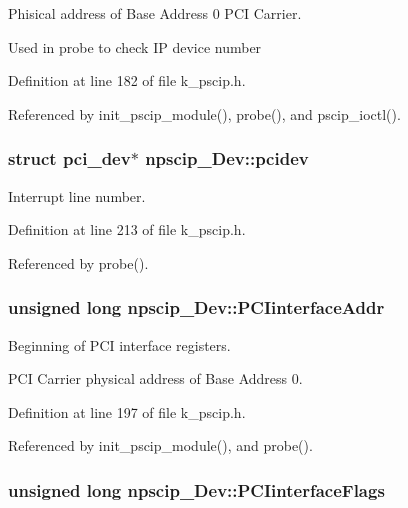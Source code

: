 Phisical address of Base Address 0 PCI Carrier. 

Used in probe to check IP device number 

Definition at line 182 of file k\_\-pscip.h.

Referenced by init\_\-pscip\_\-module(), probe(), and pscip\_\-ioctl().\hypertarget{structnpscip___dev_d017ea6be67a911fa7e0227048f42112}{
\subsubsection[{pcidev}]{\setlength{\rightskip}{0pt plus 5cm}struct pci\_\-dev$\ast$ {\bf npscip\_\-Dev::pcidev}}}
\label{structnpscip___dev_d017ea6be67a911fa7e0227048f42112}


Interrupt line number. 



Definition at line 213 of file k\_\-pscip.h.

Referenced by probe().\hypertarget{structnpscip___dev_e8a93765bbde1cad3218f1611d6ae623}{
\subsubsection[{PCIinterfaceAddr}]{\setlength{\rightskip}{0pt plus 5cm}unsigned long {\bf npscip\_\-Dev::PCIinterfaceAddr}}}
\label{structnpscip___dev_e8a93765bbde1cad3218f1611d6ae623}


Beginning of PCI interface registers. 

PCI Carrier physical address of Base Address 0. 

Definition at line 197 of file k\_\-pscip.h.

Referenced by init\_\-pscip\_\-module(), and probe().\hypertarget{structnpscip___dev_638e1740312817476855046b6fb3bd1a}{
\subsubsection[{PCIinterfaceFlags}]{\setlength{\rightskip}{0pt plus 5cm}unsigned long {\bf npscip\_\-Dev::PCIinterfaceFlags}}}
\label{structnpscip___dev_638e1740312817476855046b6fb3bd1a}


